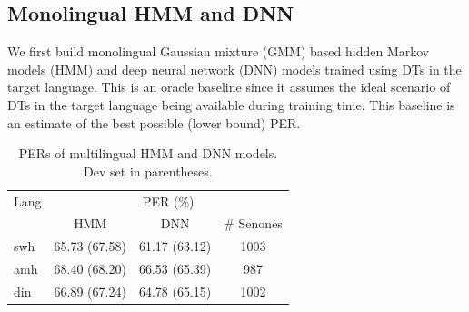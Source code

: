 \documentclass[a4paper]{article}
\begin{document}
\subsection{Monolingual HMM and DNN}
\label{sec:Monolingual HMM and DNN}
We first build monolingual Gaussian mixture (GMM) based hidden Markov models (HMM) and deep neural network (DNN) models trained using DTs in the target language. This is an oracle baseline since it assumes the ideal scenario of DTs in the target language being available during training time. This baseline is an estimate of the best possible (lower bound) PER.
%
\begin{table}[t!]
\centering %
\caption{PERs of multilingual HMM and DNN models. Dev set in parentheses.}
\begin{tabular}{l|c c c}
   \hline
Lang  & \multicolumn{3}{c}{PER (\%)} \\
          &  HMM & DNN & \# Senones   \\ \hline
swh      &65.73 (67.58)   &61.17 (63.12) & 1003 \\
amh      &68.40 (68.20)   &66.53 (65.39) &  987 \\ 
din     &66.89 (67.24)   &64.78 (65.15) & 1002  \\ \hline
\end{tabular}
\vspace{-7mm}
\label{Tab:PER_Mismatched_Multilingual}
\end{table}

\end{document}
